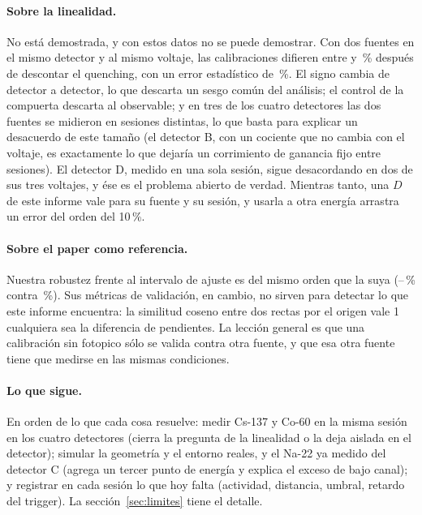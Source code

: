 \documentclass[11pt,a4paper]{article}
\begin{document}
\paragraph{Sobre la linealidad.} No está demostrada, y con estos datos no se
puede demostrar. Con dos fuentes en el mismo detector y al mismo voltaje, las
calibraciones difieren entre \DesacMin{} y \DesacMax\,\% después de
descontar el quenching, con un error estadístico de \ErrRelMediano\,\%. El
signo cambia de detector a detector, lo que descarta un sesgo común del
análisis; el control de la compuerta descarta al observable; y en tres de los
cuatro detectores las dos fuentes se midieron en sesiones distintas, lo que
basta para explicar un desacuerdo de este tamaño (el detector B, con un
cociente que no cambia con el voltaje, es exactamente lo que dejaría un
corrimiento de ganancia fijo entre sesiones). El detector D, medido en una
sola sesión, sigue desacordando en dos de sus tres voltajes, y ése es el
problema abierto de verdad. Mientras tanto, una $D$ de este informe vale para
su fuente y su sesión, y usarla a otra energía arrastra un error del orden
del 10\,\%.

\paragraph{Sobre el paper como referencia.} Nuestra robustez frente al
intervalo de ajuste es del mismo orden que la suya
(\RobustezNuestraMin--\RobustezNuestraMax\,\% contra
\RobustezPaperSinAngosta\,\%). Sus métricas de validación, en cambio, no
sirven para detectar lo que este informe encuentra: la similitud coseno
entre dos rectas por el origen vale 1 cualquiera sea la diferencia de
pendientes. La lección general es que una calibración sin fotopico sólo se
valida contra otra fuente, y que esa otra fuente tiene que medirse en las
mismas condiciones.

\paragraph{Lo que sigue.} En orden de lo que cada cosa resuelve: medir
Cs-137 y Co-60 en la misma sesión en los cuatro detectores (cierra la
pregunta de la linealidad o la deja aislada en el detector); simular la
geometría y el entorno reales, y el Na-22 ya medido del detector C (agrega un
tercer punto de energía y explica el exceso de bajo canal); y registrar en
cada sesión lo que hoy falta (actividad, distancia, umbral, retardo del
trigger). La sección~\ref{sec:limites} tiene el detalle.
\end{document}
